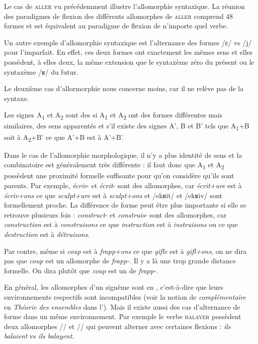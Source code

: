 Le cas de \textsc{aller} vu précédemment illustre l’allomorphie syntaxique. La réunion des paradigmes de flexion des différents allomorphes de \textsc{aller} comprend 48 formes et est équivalent au paradigme de flexion de n’importe quel verbe.

Un autre exemple d’allomorphie syntaxique est l’alternance des formes /ɛ/ vs /j/ pour l’imparfait. En effet, ces deux formes ont exactement les mêmes sens et elles possèdent, à elles deux, la même extension que le syntaxème zéro du présent ou le syntaxème /ʁ/ du futur.

Le deuxième cas d’allormorphie nous concerne moins, car il ne relève pas de la syntaxe.

{Les signes A\textsubscript{1} et A\textsubscript{2} sont des  si A\textsubscript{1} et A\textsubscript{2} ont des formes différentes mais similaires, des sens apparentés et s’il existe des signes A’, B et B’ tels que A\textsubscript{1}+B soit à A\textsubscript{2}+B’ ce que A’+B est à A’+B’.}

Dans le cas de l’allomorphie morphologique, il n’y a plus identité de sens et la combinatoire est généralement très différente : il faut donc que A\textsubscript{1} et A\textsubscript{2} possèdent une proximité formelle suffisante pour qu’on considère qu’ils sont parents. Par exemple, \textit{écriv}{}- et \textit{écrit}{}- sont des allomorphes, car \textit{écrit+ure} est à \textit{écriv+ons} ce que \textit{sculpt+ure} est à \textit{sculpt+ons} et /ekʁit/ et /ekʁiv/ sont formellement proche. La différence de forme peut être plus importante si elle se retrouve plusieurs fois : \textit{construct}{}- et \textit{construis}{}- sont des allomorphes, car \textit{construction} est à \textit{construisons} ce que \textit{instruction} est à \textit{instruisons} ou ce que \textit{destruction} est à \textit{détruisons}.

Par contre, même si \textit{coup} est à \textit{frapp+ons} ce que \textit{gifle} est à \textit{gifl+ons}, on ne dira pas que \textit{coup} est un allomorphe de \textit{frapp-}. Il y a là une trop grande distance formelle. On dira plutôt que \textit{coup} est un  de \textit{frapp-}.

En général, les allomorphes d’un signème sont en , c’est-à-dire que leurs environnements respectifs sont incompatibles (voir la notion de \textit{complémentaire} en \textit{Théorie des ensembles} dans l'). Mais il existe aussi des cas d’alternance de forme dans un même environnement. Par exemple le verbe \textsc{balayer} possèdent deux allomorphes // et // qui peuvent alterner avec certaines flexions : \textit{ils balaient} vs \textit{ils balayent}.

